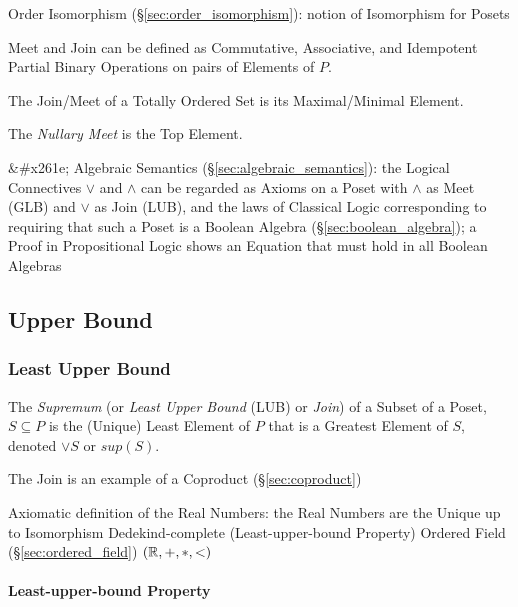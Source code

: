 Order Isomorphism (\S\ref{sec:order_isomorphism}): notion of
Isomorphism for Posets


Meet and Join can be defined as Commutative, Associative, and
Idempotent Partial Binary Operations on pairs of Elements of $P$.

The Join/Meet of a Totally Ordered Set is its Maximal/Minimal Element.

The \emph{Nullary Meet} is the Top Element.

&#x261e; Algebraic Semantics (\S\ref{sec:algebraic_semantics}): the Logical
Connectives $\vee$ and $\wedge$ can be regarded as Axioms on a Poset with
$\wedge$ as Meet (GLB) and $\vee$ as Join (LUB), and the laws of Classical
Logic corresponding to requiring that such a Poset is a Boolean Algebra
(\S\ref{sec:boolean_algebra}); a Proof in Propositional Logic shows an Equation
that must hold in all Boolean Algebras



\subsection{Upper Bound}\label{sec:upper_bound}

\subsubsection{Least Upper Bound}\label{sec:least_upperbound}

The \emph{Supremum} (or \emph{Least Upper Bound} (LUB) or \emph{Join})
of a Subset of a Poset, $S \subseteq P$ is the (Unique) Least Element
of $P$ that is a Greatest Element of $S$, denoted $\vee S$ or $sup
(S)$.

The Join is an example of a Coproduct (\S\ref{sec:coproduct})

Axiomatic definition of the Real Numbers: the Real Numbers are the Unique up to
Isomorphism Dedekind-complete (Least-upper-bound Property) Ordered Field
(\S\ref{sec:ordered_field}) $(\mathbb{R}, +, *, <)$



\paragraph{Least-upper-bound Property}\label{sec:leastupperbound_property}\hfill



